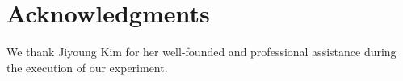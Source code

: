 \section*{Acknowledgments}
We thank Jiyoung Kim for her well-founded and professional assistance during the execution of our experiment.
